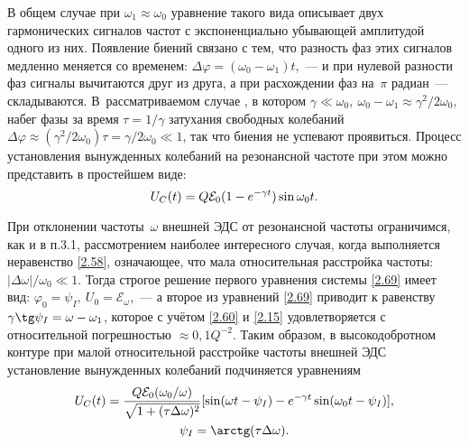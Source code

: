 В общем случае при $\omega_1\approx\omega_0$ уравнение такого вида описывает
 двух гармонических сигналов  частот с
экспоненциально убывающей амплитудой одного из них. Появление биений связано с
тем, что разность фаз этих сигналов медленно меняется со временем:
$\Delta\varphi=(\omega_0-\omega_1)t$,~--- и при нулевой разности фаз сигналы
вычитаются друг из друга, а при расхождении фаз на~$\pi$
радиан~--- складываются. В~рассматриваемом случае , в котором
$\gamma\ll\omega_0,~\omega_0-\omega_1\approx\gamma^2/2\omega_0$, набег фазы за
время $\tau=1/\gamma$ затухания свободных колебаний
$\Delta\varphi\approx(\gamma^2/2\omega_0)\tau=\gamma/2\omega_0\ll1$,  так что
биения не успевают проявиться. Процесс установления вынужденных колебаний на
резонансной частоте при этом можно представить в простейшем виде:
\begin{equation}\eqmark{2.71}
	U_C(t)=Q\mathcal{E}_0(1-e^{-\gamma t})\sin\omega_0 t.
\end{equation}

При отклонении частоты~$\omega$ внешней ЭДС от резонансной частоты
ограничимся, как и в п.3.1, рассмотрением наиболее интересного случая, когда
выполняется неравенство \eqref{2.58}, означающее, что мала относительная
расстройка частоты: $|\Delta\omega|/\omega_0\ll 1$. Тогда строгое решение первого
уравнения системы \eqref{2.69} имеет вид:
$\varphi_0=\psi_I,~U_0=\mathcal{E}_{\omega}$,~--- а второе из уравнений
\eqref{2.69} приводит к равенству $\gamma\tg\psi_I=\omega-\omega_1$, которое с
учётом \eqref{2.60} и \eqref{2.15} удовлетворяется с относительной погрешностью
$\approx0,1Q^{-2}$. Таким образом, в высокодобротном контуре при малой
относительной расстройке частоты внешней ЭДС установление вынужденных колебаний
подчиняется уравнениям
\begin{equation}
	\eqmark{2.72}
	\begin{gathered}[c]
U_C(t)=\dfrac{Q\mathcal{E}_0(\omega_0/\omega)}{\sqrt{1+(\tau\Delta\omega)^2}}[
\sin(\omega t-\psi_I)-e^{-\gamma t}\sin(\omega_0t-\psi_I)],\\
		\psi_I=\arctg(\tau\Delta\omega).
	\end{gathered}
\end{equation}

